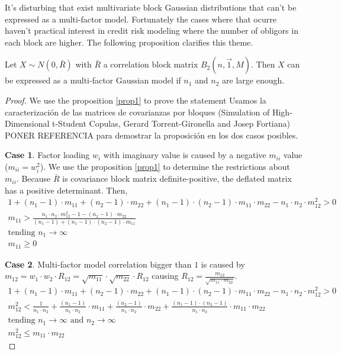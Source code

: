 \documentclass[11pt,fleqn]{book} %
\begin{document}
It's disturbing that exist multivariate block Gaussian distributions 
that can't be expressed as a multi-factor model. Fortunately the 
cases where that ocurre haven't practical interest in credit risk
modeling where the number of obligors in each block are higher. 
The following proposition clarifies this theme.

\begin{proposition}
Let $X \sim N(0,\bar{R})$ with $\bar{R}$ a correlation block matrix 
$B_2(n,\vec{1},M)$. Then $X$ can be expressed as a multi-factor 
Gaussian model if $n_1$ and $n_2$ are large enough.
\end{proposition}
\begin{proof}
We use the proposition \ref{prop1} to prove the statement Usamos la caracterización de las matrices de covarianzas por bloques (Simulation of High-Dimensional t-Student Copulas, Gerard Torrent-Gironella and Josep Fortiana) PONER REFERENCIA para demostrar la proposición en los dos casos posibles.

\textbf{Case 1}. Factor loading $w_i$ with imaginary value is caused by a negative 
$m_{ii}$ value ($m_{ii} = w_i^2$). We use the proposition \ref{prop1} to determine
the restrictions about $m_{ii}$. Because $\bar{R}$ is covariance block matrix 
definite-positive, the deflated matrix has a positive determinant. Then,
\begin{displaymath}
\begin{array}{l}
1 + (n_1-1) \cdot m_{11} + (n_2-1) \cdot m_{22} + 
(n_1-1) \cdot (n_2-1) \cdot m_{11} \cdot m_{22} -
n_1 \cdot n_2 \cdot m_{12}^2 > 0
\\
m_{11} > \frac{n_1 \cdot n_2 \cdot m_{12}^2 -1 -(n_2-1) \cdot m_{22}}
              {(n_1-1) + (n_1-1) \cdot (n_2-1) \cdot m_{11}}
\\
\textrm{tending } n_1 \to \infty
\\
m_{11} \ge 0
\end{array}
\end{displaymath}

\textbf{Case 2}. Multi-factor model correlation bigger than $1$ is caused
by $m_{12} = w_1 \cdot w_2 \cdot R_{12} = \sqrt{m_{11}} \cdot \sqrt{m_{22}} \cdot R_{12}$
causing $R_{12} = \frac{m_{12}}{\sqrt{m_{11} \cdot m_{22}}}$.
\begin{displaymath}
\begin{array}{l}
1 + (n_1-1) \cdot m_{11} + (n_2-1) \cdot m_{22} + 
(n_1-1) \cdot (n_2-1) \cdot m_{11} \cdot m_{22} -
n_1 \cdot n_2 \cdot m_{12}^2 > 0
\\
m_{12}^2 < 
\frac{1}{n_1 \cdot n_2} +
\frac{(n_1-1)}{n_1 \cdot n_2} \cdot m_{11} +
\frac{(n_2-1)}{n_1 \cdot n_2} \cdot m_{22} +
\frac{(n_1-1) \cdot (n_2-1)}{n_1 \cdot n_2} \cdot m_{11} \cdot m_{22}
\\
\textrm{tending } n_1 \to \infty \textrm{ and } n_2 \to \infty
\\
m_{12}^2 \le m_{11} \cdot m_{22}
\end{array}
\end{displaymath}

\end{proof}
\end{document}
